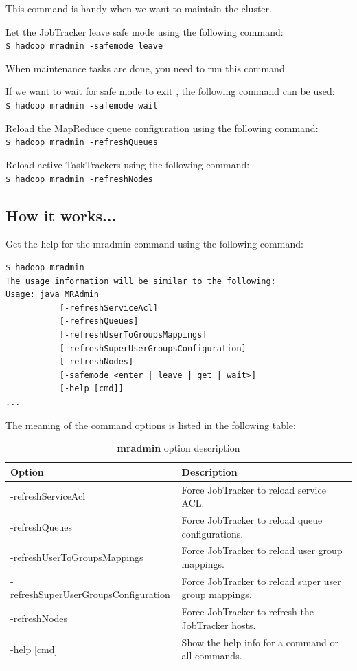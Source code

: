 This command is handy when we want to maintain the cluster.

Let the JobTracker leave safe mode using the following command: \\
\verb|$ hadoop mradmin -safemode leave|

\begin{warning} When maintenance tasks are done, you need to run this command.\end{warning}

If we want to wait for safe mode to exit , the following command can be used: \\
\verb|$ hadoop mradmin -safemode wait|

Reload the MapReduce queue configuration using the following command: \\
\verb|$ hadoop mradmin -refreshQueues|

Reload active TaskTrackers using the following command:\\
\verb|$ hadoop mradmin -refreshNodes|

\subsection*{How it works...}
Get the help for the mradmin command using the following command:
\begin{verbatim}
$ hadoop mradmin
The usage information will be similar to the following:
Usage: java MRAdmin
           [-refreshServiceAcl]
           [-refreshQueues]
           [-refreshUserToGroupsMappings]
           [-refreshSuperUserGroupsConfiguration]
           [-refreshNodes]
           [-safemode <enter | leave | get | wait>]
           [-help [cmd]]
...
\end{verbatim}

The meaning of the command options is listed in the following table:
\begin{table}
  \centering
  \begin{tabular}{ll}
    \toprule 
    \textbf{Option} & \textbf{Description} \\  \midrule
    -refreshServiceAcl & Force JobTracker to reload service ACL. \\
    -refreshQueues & Force JobTracker to reload queue configurations. \\
    -refreshUserToGroupsMappings & Force JobTracker to reload user group mappings. \\
    -refreshSuperUserGroupsConfiguration & Force JobTracker to reload super user group mappings. \\
    -refreshNodes & Force JobTracker to refresh the JobTracker hosts. \\
    -help [cmd] & Show the help info for a command or all commands. \\ \bottomrule
  \end{tabular} 
  \caption{\textbf{mradmin} option description}\label{tbl:mradmin}
\end{table}

